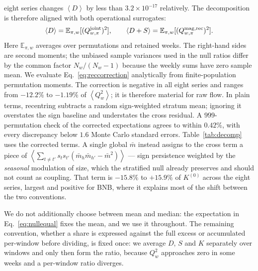 \documentclass[aps,pre,twocolumn,superscriptaddress,floatfix,nofootinbib]{revtex4-2}
\newcommand{\avg}[1]{\left\langle #1 \right\rangle}
\begin{document}
eight series changes $\avg D$ by less than $3.2\times10^{-17}$ relatively.
The decomposition is therefore aligned with both operational surrogates:
\begin{equation}
  \avg{D}=\mathbb E_{\pi,w}[(Q_{w,\pi}^{\rm joint})^2],\qquad
  \avg{D+S}=\mathbb E_{\pi,w}[(Q_{w,\pi}^{\rm mag,rec})^2] .
  \label{eq:nullequal}
\end{equation}
Here $\mathbb E_{\pi,w}$ averages over permutations and retained weeks. The
right-hand sides are second moments; the unbiased sample variances used in the
null ratios differ by the common factor $N_w/(N_w-1)$ because the weekly sums
have zero sample mean. We evaluate Eq.~\eqref{eq:reccorrection} analytically
from finite-population permutation moments. The correction is negative in all
eight series and ranges from $-12.2\%$ to $-1.19\%$ of $\avg{Q_w^2}$; it is
therefore material for raw flow. In plain terms, recentring subtracts a random
sign-weighted stratum mean; ignoring it overstates the sign baseline and
understates the cross residual. A $999$-permutation check of the corrected
expectations agrees to within $0.42\%$, with every discrepancy below $1.6$
Monte Carlo standard errors. Table~\ref{tab:decomp} uses the corrected terms. A
single global $\bar m$ instead assigns to the cross term a piece of
$\avg{\sum_{t\neq t'}s_ts_{t'}(\bar m_h\bar m_{h'}-\bar m^2)}$ --- sign
persistence weighted by the \emph{seasonal} modulation of size, which the
stratified null already preserves and should not count as coupling. That term
is $-15.8\%$ to $+15.9\%$ of $K^{(0)}$ across the eight series, largest and
positive for BNB,
where it explains most of the shift between the two conventions.

We do not additionally choose between mean and median: the expectation in
Eq.~\eqref{eq:nullequal} fixes the mean, and we use it throughout. The
remaining convention, whether a
share is expressed against the full excess or accumulated per-window before
dividing, is fixed once: we average $D$, $S$ and $K$ separately over windows
and only then form the ratio, because $Q_w^2$ approaches zero in some weeks and
a per-window ratio diverges.
\end{document}
